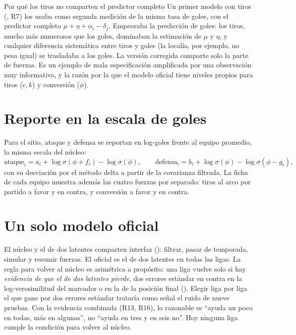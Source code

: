 \begin{nota}{Por qué los tiros no comparten el predictor completo}
Un primer modelo con tiros (, R7) los usaba como segunda medición de la misma tasa de goles, con el predictor completo $\mu+\eta+\alpha_i-\delta_j$. Empeoraba la predicción de goles: los tiros, mucho más numerosos que los goles, dominaban la estimación de $\mu$ y $\eta$, y cualquier diferencia sistemática entre tiros y goles (la localía, por ejemplo, no pesa igual) se trasladaba a los goles. La versión corregida comparte solo la parte de fuerzas. Es un ejemplo de mala especificación amplificada por una observación muy informativa, y la razón por la que el modelo oficial tiene niveles propios para tiros ($c,k$) y conversión ($\phi$).
\end{nota}

\section{Reporte en la escala de goles}

Para el sitio, ataque y defensa se reportan en log-goles frente al equipo promedio, la misma escala del núcleo:
\[
\text{ataque}_i=a_i+\log\sigma(\phi+f_i)-\log\sigma(\phi),\qquad \text{defensa}_i=b_i+\log\sigma(\phi)-\log\sigma(\phi-g_i),
\]
con su desviación por el método delta a partir de la covarianza filtrada. La ficha de cada equipo muestra además las cuatro fuerzas por separado: tiros al arco por partido a favor y en contra, y conversión a favor y en contra.

\section{Un solo modelo oficial}
\label{sec:seleccion}

El núcleo y el de dos latentes comparten interfaz (): filtrar, pasar de temporada, simular y resumir fuerzas. El oficial es el de dos latentes en todas las ligas. La regla para volver al núcleo es asimétrica a propósito: una liga vuelve solo si hay \emph{evidencia de que el de dos latentes pierde}, dos errores estándar en contra en la log-verosimilitud del marcador o en la de la posición final (). Elegir liga por liga el que gane por dos errores estándar trataría como señal el ruido de nueve pruebas. Con la evidencia combinada (R13, R16), lo razonable es ``ayuda un poco en todas, más en algunas'', no ``ayuda en tres y en seis no''. Hoy ninguna liga cumple la condición para volver al núcleo.
